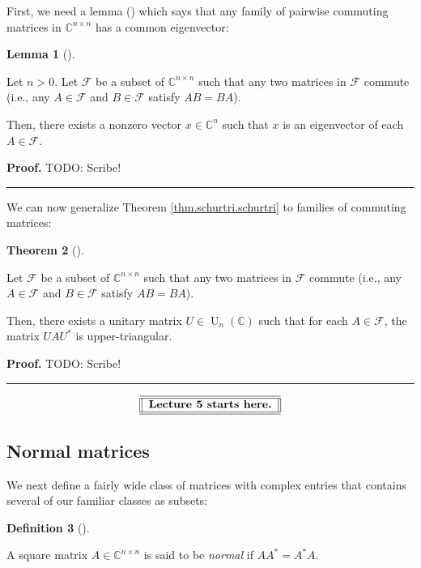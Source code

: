 \documentclass[numbers=enddot,12pt,final,onecolumn,notitlepage]{scrartcl}%
\numberwithin{exer}{subsection}
\theoremstyle{definition}
\newtheorem{theo}{Theorem}[subsection]
\newenvironment{theorem}[1][]
{\begin{theo}[#1]\begin{leftbar}}
{\end{leftbar}\end{theo}}
\newtheorem{lem}[theo]{Lemma}
\newenvironment{lemma}[1][]
{\begin{lem}[#1]\begin{leftbar}}
{\end{leftbar}\end{lem}}
\newtheorem{defi}[theo]{Definition}
\newenvironment{definition}[1][]
{\begin{defi}[#1]\begin{leftbar}}
{\end{leftbar}\end{defi}}
\newenvironment{proof}[1][Proof]{\noindent\textbf{#1.} }{\ \rule{0.5em}{0.5em}}
\begin{document}
First, we need a lemma (\cite[Lemma 1.3.19]{HorJoh13}) which says that any
family of pairwise commuting matrices in $\mathbb{C}^{n\times n}$ has a common eigenvector:

\begin{lemma}
\label{lem.schurtri.commute.1}Let $n>0$. Let $\mathcal{F}$ be a subset of
$\mathbb{C}^{n\times n}$ such that any two matrices in $\mathcal{F}$ commute
(i.e., any $A\in\mathcal{F}$ and $B\in\mathcal{F}$ satisfy $AB=BA$).

Then, there exists a nonzero vector $x\in\mathbb{C}^{n}$ such that $x$ is an
eigenvector of each $A\in\mathcal{F}$.
\end{lemma}

\begin{proof}
TODO: Scribe!
\end{proof}

We can now generalize Theorem \ref{thm.schurtri.schurtri} to families of
commuting matrices:

\begin{theorem}
\label{thm.schurtri.commute.schurtri}Let $\mathcal{F}$ be a subset of
$\mathbb{C}^{n\times n}$ such that any two matrices in $\mathcal{F}$ commute
(i.e., any $A\in\mathcal{F}$ and $B\in\mathcal{F}$ satisfy $AB=BA$).

Then, there exists a unitary matrix $U\in\operatorname*{U}\nolimits_{n}\left(
\mathbb{C}\right)  $ such that for each $A\in\mathcal{F}$, the matrix
$UAU^{\ast}$ is upper-triangular.
\end{theorem}

\begin{proof}
TODO: Scribe!
\end{proof}

%

\[%
\begin{tabular}
[c]{||l||}\hline\hline
\textbf{Lecture 5 starts here.}\\\hline\hline
\end{tabular}
\]


\subsection{Normal matrices}

We next define a fairly wide class of matrices with complex entries that
contains several of our familiar classes as subsets:

\begin{definition}
\label{def.schurtri.normal.normal}A square matrix $A\in\mathbb{C}^{n\times n}$
is said to be \emph{normal} if $AA^{\ast}=A^{\ast}A$.
\end{definition}
\end{document}
